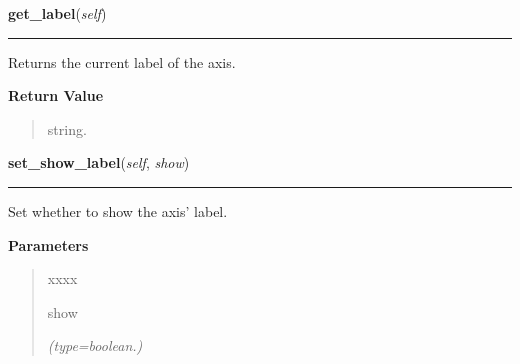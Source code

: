     \label{pygtk_chart:line_chart:Axis:get_label}

    \vspace{0.5ex}

\hspace{.8\funcindent}\begin{boxedminipage}{\funcwidth}

    \raggedright \textbf{get\_label}(\textit{self})

    \vspace{-1.5ex}

    \rule{\textwidth}{0.5\fboxrule}
\setlength{\parskip}{2ex}
    Returns the current label of the axis.

\setlength{\parskip}{1ex}
      \textbf{Return Value}
    \vspace{-1ex}

      \begin{quote}
      string.

      \end{quote}

    \end{boxedminipage}

    \label{pygtk_chart:line_chart:Axis:set_show_label}

    \vspace{0.5ex}

\hspace{.8\funcindent}\begin{boxedminipage}{\funcwidth}

    \raggedright \textbf{set\_show\_label}(\textit{self}, \textit{show})

    \vspace{-1.5ex}

    \rule{\textwidth}{0.5\fboxrule}
\setlength{\parskip}{2ex}
    Set whether to show the axis' label.

\setlength{\parskip}{1ex}
      \textbf{Parameters}
      \vspace{-1ex}

      \begin{quote}
        \begin{Ventry}{xxxx}

          \item[show]

            {\it (type=boolean.)}

        \end{Ventry}

      \end{quote}

    \end{boxedminipage}

